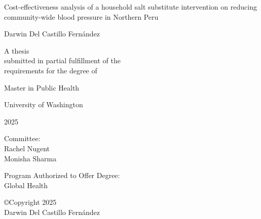 \documentclass[12pt]{report}
\newcommand{\thesistitle}{Cost-effectiveness analysis of a household salt substitute intervention on reducing community-wide blood pressure in Northern Peru}
\newcommand{\authorname}{Darwin Del Castillo Fernández}
\newcommand{\degreename}{Master in Public Health}
\newcommand{\graduationyear}{2025}
\newcommand{\chairname}{Rachel Nugent}
\newcommand{\committeememberone}{Monisha Sharma}
\newcommand{\departmentname}{Global Health}
\begin{document}

\begin{titlepage}
\begin{center}

\vspace*{1cm}
{\LARGE \thesistitle}\\
\vspace{1.5cm}

{\large \authorname}\\
\vspace{1.5cm}

A thesis\\
submitted in partial fulfillment of the\\
requirements for the degree of\\
\vspace{0.5cm}

{\large \degreename}\\
\vspace{0.5cm}

University of Washington\\
\vspace{0.5cm}

{\large \graduationyear}\\
\vspace{1cm}

Committee:\\
\chairname\\
\committeememberone\\
\vspace{1cm}

Program Authorized to Offer Degree:\\
\departmentname\\

\end{center}
\end{titlepage}


\thispagestyle{empty}
\vspace*{3cm}
\begin{center}
©Copyright \graduationyear\\
\authorname
\end{center}
\clearpage
\end{document}
